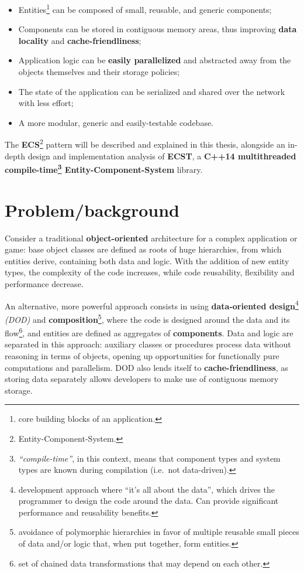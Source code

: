 \documentclass[twoside, 12pt, a4paper, openright]{book}
\begin{document}
\begin{itemize}
\item
  Entities\footnote{core building blocks of an application.} can be
  composed of small, reusable, and generic components;
\item
  Components can be stored in contiguous memory areas, thus improving
  \textbf{data locality} and \textbf{cache-friendliness};
\item
  Application logic can be \textbf{easily parallelized} and abstracted
  away from the objects themselves and their storage policies;
\item
  The state of the application can be serialized and shared over the
  network with less effort;
\item
  A more modular, generic and easily-testable codebase.
\end{itemize}

The \textbf{ECS}\footnote{Entity-Component-System.} pattern will be
described and explained in this thesis, alongside an in-depth design and
implementation analysis of \textbf{ECST}, a \textbf{C++14 multithreaded
compile-time\footnote{\emph{``compile-time''}, in this context, means
  that component types and system types are known during compilation
  (i.e.~not data-driven).} Entity-Component-System} library.

\section{Problem/background}\label{problembackground}

Consider a traditional \textbf{object-oriented} architecture for a
complex application or game: base object classes are defined as roots of
huge hierarchies, from which entities derive, containing both data and
logic. With the addition of new entity types, the complexity of the code
increases, while code reusability, flexibility and performance decrease.

An alternative, more powerful approach consists in using
\textbf{data-oriented design}\footnote{development approach where ``it's
  all about the data'', which drives the programmer to design the code
  around the data. Can provide significant performance and reusability
  benefits.} \emph{(DOD)} and \textbf{composition}\footnote{avoidance of
  polymorphic hierarchies in favor of multiple reusable small pieces of
  data and/or logic that, when put together, form entities.}, where the
code is designed around the data and its flow\footnote{set of chained
  data transformations that may depend on each other.}, and entities are
defined as aggregates of \textbf{components}. Data and logic are
separated in this approach: auxiliary classes or procedures process data
without reasoning in terms of objects, opening up opportunities for
functionally pure computations and parallelism. DOD also lends itself to
\textbf{cache-friendliness}, as storing data separately allows
developers to make use of contiguous memory storage.
\end{document}
